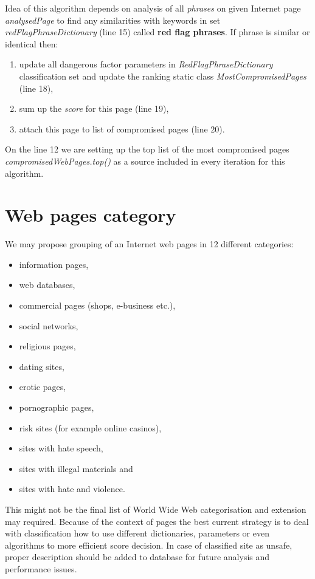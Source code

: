 \documentclass[9pt,a4paper]{extarticle}
\begin{document}
\begin{multicols}{2}
Idea of this algorithm depends on analysis of all \textit{phrases} on given Internet page \textit{analysedPage} to find any similarities 
with keywords in set \textit{redFlagPhraseDictionary} (line 15) called \textbf{red flag phrases}. If phrase is similar or identical then:
\begin{enumerate}
\item update all dangerous factor parameters in \textit{RedFlagPhraseDictionary} classification set and update the ranking static class \textit{MostCompromisedPages} (line 18),
\item sum up the \textit{score} for this page (line 19),
\item attach this page to list of compromised pages (line 20).
\end{enumerate}
On the line 12 we are setting up the top list of the most compromised pages \textit{compromisedWebPages.top()} as a source included in every iteration for this algorithm.

\section{Web pages category}
We may propose grouping of an Internet web pages in 12 different categories:
\begin{itemize}
\item information pages,
\item web databases,
\item commercial pages (shops, e-business etc.),
\item social networks,
\item religious pages,
\item dating sites,
\item erotic pages,
\item pornographic pages,
\item risk sites (for example online casinos),
\item sites with hate speech,
\item sites with illegal materials and
\item sites with hate and violence.
\end{itemize}
This might not be  the final list of World Wide Web categorisation and extension may required. Because of the context of pages the best current strategy is to deal with classification how to use different dictionaries, parameters or even algorithms to more efficient score decision. In case of classified  site as  unsafe, proper description should be added to database for future analysis and performance issues.


\end{multicols}
\end{document}
